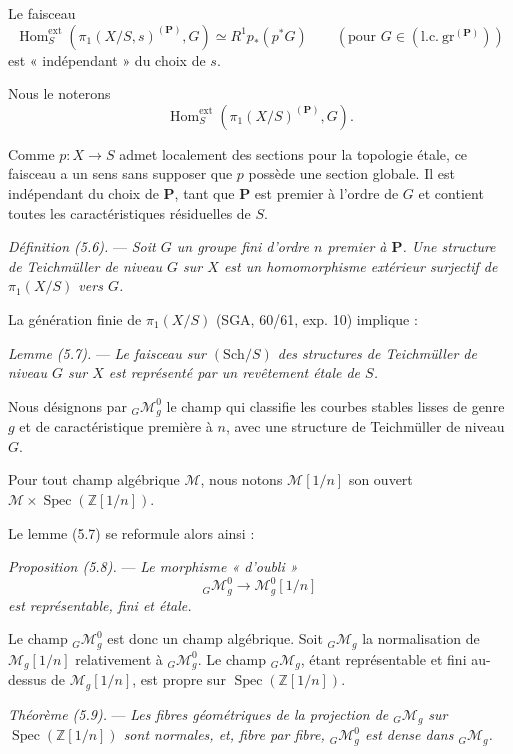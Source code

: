 \documentclass[10pt]{article}
\newcommand{\Spec}{\operatorname{Spec}}
\newcommand{\Hom}{\operatorname{Hom}}
\begin{document}
Le faisceau
\[
\Hom_S^{\mathrm{ext}}(\pi_1(X/S,s)^{(\mathbf P)},G)\simeq R^1p_*(p^*G)
\qquad ( \text{pour }G\in(\mathrm{l.c.}\ \mathrm{gr}^{(\mathbf P)}) )
\]
est « indépendant » du choix de $s$.

Nous le noterons
\[
\Hom_S^{\mathrm{ext}}(\pi_1(X/S)^{(\mathbf P)},G).
\]

Comme $p:X\to S$ admet localement des sections pour la topologie étale, ce faisceau a un sens sans supposer que $p$ possède une section globale. Il est indépendant du choix de $\mathbf P$, tant que $\mathbf P$ est premier à l'ordre de $G$ et contient toutes les caractéristiques résiduelles de $S$.

\medskip
\noindent\emph{Définition (5.6).} --- \emph{Soit $G$ un groupe fini d'ordre $n$ premier à $\mathbf P$. Une structure de Teichmüller de niveau $G$ sur $X$ est un homomorphisme extérieur surjectif de $\pi_1(X/S)$ vers $G$.}

La génération finie de $\pi_1(X/S)$ (SGA, 60/61, exp. 10) implique :

\medskip
\noindent\emph{Lemme (5.7).} --- \emph{Le faisceau sur $(\mathrm{Sch}/S)$ des structures de Teichmüller de niveau $G$ sur $X$ est représenté par un revêtement étale de $S$.}

Nous désignons par ${}_G\mathcal M_g^0$ le champ qui classifie les courbes stables lisses de genre $g$ et de caractéristique première à $n$, avec une structure de Teichmüller de niveau $G$.

Pour tout champ algébrique $\mathscr M$, nous notons $\mathscr M[1/n]$ son ouvert $\mathscr M\times\Spec(\mathbb Z[1/n])$.

Le lemme (5.7) se reformule alors ainsi :

\medskip
\noindent\emph{Proposition (5.8).} --- \emph{Le morphisme « d'oubli »}
\[
{}_G\mathcal M_g^0\longrightarrow \mathcal M_g^0[1/n]
\]
\emph{est représentable, fini et étale.}

Le champ ${}_G\mathcal M_g^0$ est donc un champ algébrique. Soit ${}_G\mathcal M_g$ la normalisation de $\mathcal M_g[1/n]$ relativement à ${}_G\mathcal M_g^0$. Le champ ${}_G\mathcal M_g$, étant représentable et fini au-dessus de $\mathcal M_g[1/n]$, est propre sur $\Spec(\mathbb Z[1/n])$.

\medskip
\noindent\emph{Théorème (5.9).} --- \emph{Les fibres géométriques de la projection de ${}_G\mathcal M_g$ sur $\Spec(\mathbb Z[1/n])$ sont normales, et, fibre par fibre, ${}_G\mathcal M_g^0$ est dense dans ${}_G\mathcal M_g$.}
\end{document}
